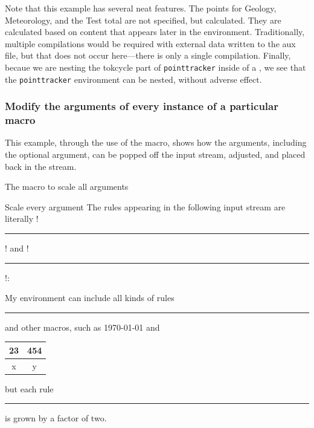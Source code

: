 \documentclass[10pt]{article}
\newcommand\TokCycle{\textsf{tokcycle}}
\begin{document}
Note that this example has several neat features.
The points for Geology, Meteorology, and the Test total are not specified,
  but calculated.
They are calculated based on content that appears later in the environment.
Traditionally, multiple compilations would be required with external data
  written to the aux file, but that does not occur here---there is only
  a single compilation.
Finally, becaue we are nesting the \TokCycle{} part of \texttt{pointtracker} 
  inside of a , we see that the \texttt{pointtracker} 
  environment can be nested, without adverse effect.

\endgroup

\subsubsection{Modify the arguments of every instance of a particular macro}

\begingroup

This example, through the use of the  macro, shows how
  the  arguments, including the optional argument, can be
  popped off the input stream, adjusted, and placed back in the stream.

\begin{exampleC}[]{The  macro to scale all
   arguments}
\newcommand\scalerule[1]{%
  \tcpeek\zA
  \ifx[\zA\tcpopuntil]\opt\fi%
  \tcpop\ArgA%
  \tcpop\ArgB%
  \tcpushgroup[x]{#1\dimexpr\ArgB}%
  \tcpushgroup[x]{#1\dimexpr\ArgA}
  \ifx[\zA\tcpush[x]{\expandafter\scaleopt\opt{#1}}\fi
}
\def\scaleopt[#1]#2{[#2\dimexpr#1]}
\end{exampleC}

\begin{exampleA}[lefthand width=9.2cm]{Scale every  argument}
\resettokcycle
\settcEscapechar{!}%
\tokencyclexpress 
The rules appearing in the following input stream are literally
!\rule[-2pt]{1.5ex}{1.5ex}! and !\rule{2ex}{3pt}!:

My environment can include all kinds of rules 
  \rule[-2pt]{1.5ex}{1.5ex} and other macros, such as \today{} and
\begin{tabular}{c|c}
23 & 454\\\hline
x & y
\end{tabular}
but each rule \rule{2ex}{3pt} is grown by a factor of two.
\endtokencyclexpress
\end{exampleA}
\settcEscapechar{|}
\end{document}
